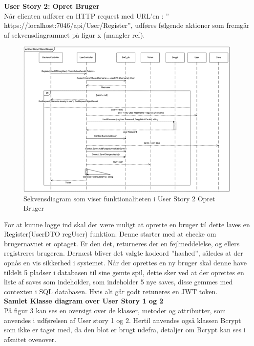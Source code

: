 \textbf{User Story 2: Opret Bruger}\\
Når clienten udfører en HTTP request med URL’en : ” https://localhost:7046/api/User/Register”, udføres følgende aktioner som fremgår af sekvensdiagrammet på figur x (mangler ref).\\

\begin{figure}[h]
\centering
\includegraphics[width = \textwidth]{02-Body/Images/Backend_sekvens_2.PNG}
\caption{Sekvensdiagram som viser funktionaliteten i User Story 2 Opret Bruger}
\label{fig:Arkitektur-Backend-Sekvens-2}
\end{figure}

For at kunne logge ind skal det være muligt at oprette en bruger til dette laves en Register(UserDTO regUser) funktion. Denne starter med at checke om brugernavnet er optaget. Er den det, returneres der en fejlmeddelelse, og ellers registreres brugeren. Dernæst bliver det valgte kodeord ”hashed”, således at der opnås en vis sikkerhed i systemet. Når der oprettes en ny bruger skal denne have tildelt 5 pladser i databasen til sine gemte spil, dette sker ved at der oprettes en liste af saves som indeholder, som indeholder 5 nye saves, disse gemmes med contexten i SQL databasen. Hvis alt går godt retuneres en JWT token.\\

\textbf{Samlet Klasse diagram over User Story 1 og 2}\\

På figur 3 kan ses en oversigt over de klasser, metoder og attributter, som anvendes i udførelsen af User story 1 og 2. Hertil anvendes også klassen Bcrypt som ikke er taget med, da den blot er brugt udefra, detaljer om Bcrypt kan ses i afsnitet ovenover.\\

